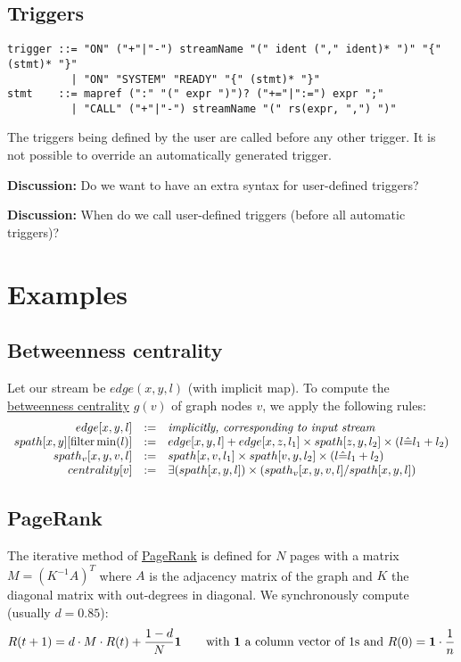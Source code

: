 \documentclass[11pt]{article}
\newlength{\dlen}
\def\discuss#1{\par\hspace{2em}
\setlength{\dlen}{\textwidth}
\addtolength{\dlen}{-2em}
\begin{minipage}{\dlen}\footnotesize {\bf\color{red} Discussion:} #1\end{minipage}\par}
\begin{document}
\subsection{Triggers}
\begin{verbatim}
trigger ::= "ON" ("+"|"-") streamName "(" ident ("," ident)* ")" "{" (stmt)* "}"
          | "ON" "SYSTEM" "READY" "{" (stmt)* "}"
stmt    ::= mapref (":" "(" expr ")")? ("+="|":=") expr ";"
          | "CALL" ("+"|"-") streamName "(" rs(expr, ",") ")"
\end{verbatim}
The triggers being defined by the user are called before any other trigger. It is not possible to override an automatically generated trigger.
\discuss{Do we want to have an extra syntax for user-defined triggers?}
\discuss{When do we call user-defined triggers (before all automatic triggers)?}

\newpage
\section{Examples}
\subsection{Betweenness centrality}
Let our stream be $edge(x,y,l)$ (with implicit map). To compute the \href{http://en.wikipedia.org/wiki/Betweenness_centrality}{betweenness centrality} $g(v)$ of graph nodes $v$, we apply the following rules:
\[\begin{array}{rcl}
edge[x,y,l] &:=& \text{\it implicitly, corresponding to input stream} \\
spath[x,y][{\rm filter} \min(l)] &:=& edge[x,y,l] +  edge[x,z,l_1] \times spath[z,y,l_2] \times (l\hat= l_1+l_2)\\
spath_v[x,y,v,l] &:=& spath[x,v,l_1] \times spath[v,y,l_2] \times (l\hat= l_1+l_2)\\
centrality[v] &:=& \exists(spath[x,y,l]) \times (spath_v[x,y,v,l] / spath[x,y,l])
\end{array}\]

\subsection{PageRank} \label{pb:pagerank}
The iterative method of \href{http://en.wikipedia.org/wiki/PageRank#Iterative}{PageRank} is defined for $N$ pages with a matrix $M=(K^{-1} A)^T$ where $A$ is the adjacency matrix of the graph and $K$ the diagonal matrix with out-degrees in diagonal. We synchronously compute (usually $d=0.85$):
\[R(t+1)=d\cdot M\cdot R(t)+\dfrac{1-d}{N}{\bf 1} \qquad \text{with {\bf 1} a column vector of 1s and }R(0)={\bf 1}\cdot \frac{1}{n}\]
\end{document}
